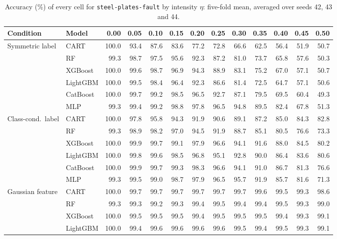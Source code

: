 \documentclass[pdflatex,sn-mathphys]{sn-jnl}
\theoremstyle{thmstyleone}
\begin{document}
\begin{table}[htbp]
\centering
\tiny
\setlength{\tabcolsep}{2.6pt}
\caption{Accuracy (\%) of every cell for \texttt{steel-plates-fault} by intensity $\eta$: five-fold mean, averaged over seeds 42, 43 and 44.}
\label{tab:grid_steel_plates_fault}
\begin{tabular}{@{}llrrrrrrrrrrr@{}}
\toprule
Condition & Model & 0.00 & 0.05 & 0.10 & 0.15 & 0.20 & 0.25 & 0.30 & 0.35 & 0.40 & 0.45 & 0.50 \\
\midrule
Symmetric label & CART & 100.0 & 93.4 & 87.6 & 83.6 & 77.2 & 72.8 & 66.6 & 62.5 & 56.4 & 51.9 & 50.7 \\
 & RF & 99.3 & 98.7 & 97.5 & 95.6 & 92.3 & 87.2 & 81.0 & 73.7 & 65.8 & 57.6 & 50.3 \\
 & XGBoost & 100.0 & 99.6 & 98.7 & 96.9 & 94.3 & 88.9 & 83.1 & 75.2 & 67.0 & 57.1 & 50.7 \\
 & LightGBM & 100.0 & 99.5 & 98.4 & 96.4 & 92.3 & 86.6 & 81.4 & 72.5 & 64.7 & 57.1 & 50.6 \\
 & CatBoost & 100.0 & 99.7 & 99.2 & 98.5 & 96.5 & 92.7 & 87.1 & 79.5 & 69.5 & 60.4 & 49.3 \\
 & MLP & 99.3 & 99.4 & 99.2 & 98.8 & 97.8 & 96.5 & 94.8 & 89.5 & 82.4 & 67.8 & 51.3 \\
\midrule
Class-cond.\ label & CART & 100.0 & 97.8 & 95.8 & 94.3 & 91.9 & 90.6 & 89.1 & 87.2 & 85.0 & 84.3 & 82.8 \\
 & RF & 99.3 & 98.9 & 98.2 & 97.0 & 94.5 & 91.9 & 88.7 & 85.1 & 80.5 & 76.6 & 73.3 \\
 & XGBoost & 100.0 & 99.9 & 99.7 & 99.1 & 97.9 & 96.6 & 94.1 & 91.6 & 88.0 & 84.5 & 80.2 \\
 & LightGBM & 100.0 & 99.8 & 99.6 & 98.5 & 96.8 & 95.1 & 92.8 & 90.0 & 86.4 & 83.6 & 80.6 \\
 & CatBoost & 100.0 & 99.9 & 99.7 & 99.3 & 98.3 & 96.6 & 94.1 & 91.0 & 86.7 & 81.3 & 76.6 \\
 & MLP & 99.3 & 99.5 & 99.0 & 98.7 & 97.9 & 96.5 & 95.7 & 91.9 & 85.7 & 81.6 & 71.3 \\
\midrule
Gaussian feature & CART & 100.0 & 99.7 & 99.7 & 99.7 & 99.7 & 99.7 & 99.7 & 99.6 & 99.5 & 99.3 & 98.6 \\
 & RF & 99.3 & 99.3 & 99.2 & 99.3 & 99.4 & 99.5 & 99.4 & 99.4 & 99.5 & 99.3 & 99.0 \\
 & XGBoost & 100.0 & 99.5 & 99.5 & 99.5 & 99.4 & 99.5 & 99.5 & 99.5 & 99.4 & 99.3 & 99.1 \\
 & LightGBM & 100.0 & 99.4 & 99.6 & 99.6 & 99.6 & 99.6 & 99.5 & 99.4 & 99.5 & 99.3 & 99.1 \\

\end{tabular}
\end{table}
\end{document}

